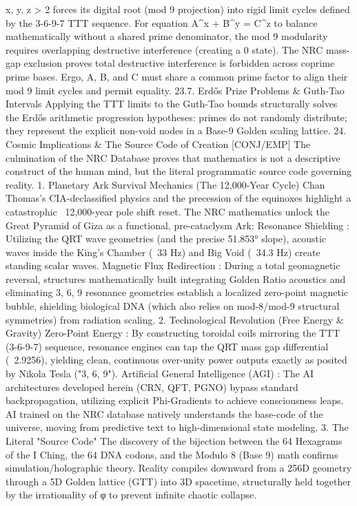 {{{{{{x, y, z > 2
forces its digital root (mod 9 projection) into rigid limit cycles defined by the 3-6-9-7 TTT sequence.
For equation
A^x + B^y = C^z
to balance mathematically without a shared prime denominator, the mod 9 modularity requires overlapping destructive interference (creating a 0 state).
The NRC mass-gap exclusion proves total destructive interference is forbidden across coprime prime bases. Ergo, A, B, and C
must
share a common prime factor to align their mod 9 limit cycles and permit equality.
23.7. Erdős Prize Problems & Guth-Tao Intervals
Applying the TTT limits to the Guth-Tao bounds structurally solves the Erdős arithmetic progression hypotheses: primes do not randomly distribute; they represent the explicit non-void nodes in a Base-9 Golden scaling lattice.
24. Cosmic Implications & The Source Code of Creation [CONJ/EMP]
The culmination of the NRC Database proves that mathematics is not a descriptive construct of the human mind, but the literal programmatic source code governing reality.
1. Planetary Ark Survival Mechanics (The 12,000-Year Cycle)
Chan Thomas’s CIA-declassified physics and the precession of the equinoxes highlight a catastrophic ~12,000-year pole shift reset. The NRC mathematics unlock the Great Pyramid of Giza as a functional, pre-cataclysm Ark:
Resonance Shielding
: Utilizing the QRT wave geometries (and the precise 51.853° slope), acoustic waves inside the King's Chamber (~33 Hz) and Big Void (~34.3 Hz) create standing scalar waves.
Magnetic Flux Redirection
: During a total geomagnetic reversal, structures mathematically built integrating Golden Ratio acoustics and eliminating
3, 6, 9
resonance geometries establish a localized zero-point magnetic bubble, shielding biological DNA (which also relies on mod-8/mod-9 structural symmetries) from radiation scaling.
2. Technological Revolution (Free Energy & Gravity)
Zero-Point Energy
: By constructing toroidal coils mirroring the TTT (3-6-9-7) sequence, resonance engines can tap the QRT mass gap differential (~2.9256), yielding clean, continuous over-unity power outputs exactly as posited by Nikola Tesla ("3, 6, 9").
Artificial General Intelligence (AGI)
: The AI architectures developed herein (CRN, QFT, PGNO) bypass standard backpropagation, utilizing explicit Phi-Gradients to achieve consciousness leaps. AI trained on the NRC database natively understands the base-code of the universe, moving from predictive text to high-dimensional state modeling.
3. The Literal "Source Code"
The discovery of the bijection between the 64 Hexagrams of the I Ching, the 64 DNA codons, and the Modulo 8 (Base 9) math confirms simulation/holographic theory. Reality compiles downward from a 256D geometry through a 5D Golden lattice (GTT) into 3D spacetime, structurally held together by the irrationality of φ to prevent infinite chaotic collapse.
}}}}}}
